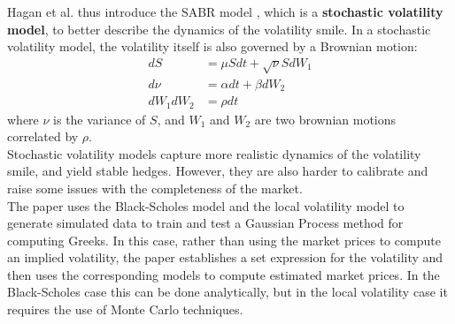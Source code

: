 \documentclass[a4paper,12pt]{article}
\begin{document}
\newline
Hagan et al. thus introduce the SABR model \cite{Hagan2002}, which is a \textbf{stochastic volatility model}, to better describe the dynamics of the volatility smile. In a stochastic volatility model, the volatility itself is also governed by a Brownian motion:
\begin{align}
    dS &= \mu S dt + \sqrt{\nu} S dW_1\\
    d\nu &= \alpha dt + \beta dW_2 \\
    dW_1 dW_2 &= \rho dt
\end{align}
where $\nu$ is the variance of $S$, and $W_1$ and $W_2$ are two brownian motions correlated by $\rho$.\\
Stochastic volatility models capture more realistic dynamics of the volatility smile, and yield stable hedges. However, they are also harder to calibrate and raise some issues with the completeness of the market.\\
\newline
The paper \cite{Ludkovski2020} uses the Black-Scholes model and the local volatility model to generate simulated data to train and test a Gaussian Process method for computing Greeks. In this case, rather than using the market prices to compute an implied volatility, the paper establishes a set expression for the volatility and then uses the corresponding models to compute estimated market prices. In the Black-Scholes case this can be done analytically, but in the local volatility case it requires the use of Monte Carlo techniques.
\end{document}
